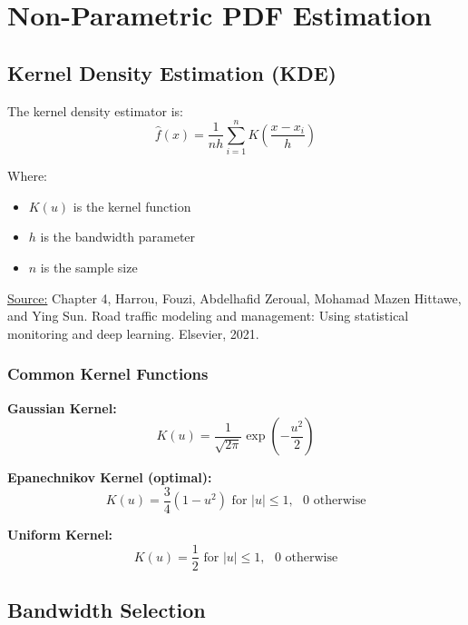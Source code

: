 \documentclass[12pt, xcolor=dvipsnames,svgnames,x11names]{article}
\begin{document}
\section{Non-Parametric PDF Estimation}

\subsection{Kernel Density Estimation (KDE)}

The kernel density estimator is:
\begin{equation}
\hat{f}(x) = \frac{1}{nh} \sum_{i=1}^n K\left(\frac{x - x_i}{h}\right)
\end{equation}

Where:
\begin{itemize}
\item $K(u)$ is the kernel function
\item $h$ is the bandwidth parameter
\item $n$ is the sample size
\end{itemize}

\underline{Source:} Chapter 4, Harrou, Fouzi, Abdelhafid Zeroual, Mohamad Mazen Hittawe, and Ying Sun. Road traffic modeling and management: Using statistical monitoring and deep learning. Elsevier, 2021.

\subsubsection{Common Kernel Functions}

\textbf{Gaussian Kernel:}
\begin{equation}
K(u) = \frac{1}{\sqrt{2\pi}} \exp\left(-\frac{u^2}{2}\right)
\end{equation}

\textbf{Epanechnikov Kernel (optimal):}
\begin{equation}
K(u) = \frac{3}{4}(1 - u^2) \text{ for } |u| \leq 1, \text{ } 0 \text{ otherwise}
\end{equation}

\textbf{Uniform Kernel:}
\begin{equation}
K(u) = \frac{1}{2} \text{ for } |u| \leq 1, \text{ } 0 \text{ otherwise}
\end{equation}

\subsection{Bandwidth Selection}
\end{document}
